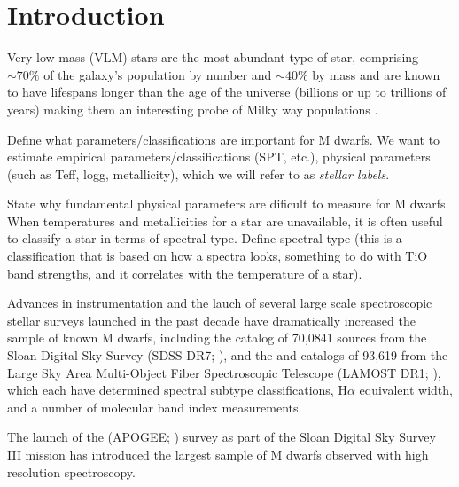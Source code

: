 \documentclass[modern]{aastex62}
\begin{document}
 
\section{Introduction} \label{sec:intro}

Very low mass (VLM) stars are the most abundant type of star, comprising $\sim 70 \%$ of the galaxy's population by number \citep{Bochanski:2010} and $\sim 40 \%$ by mass and are known to have lifespans longer than the age of the universe (billions or up to trillions of years) \citep{Laughlin:1997} making them an interesting probe of Milky way populations \citep{Bochanski:2007}.


Define what parameters/classifications are important for M dwarfs. We want to estimate empirical parameters/classifications (SPT, etc.), physical parameters (such as Teff, logg, metallicity), which we will refer to as \emph{stellar labels}. 

State why fundamental physical parameters are dificult to measure for M dwarfs. When temperatures and metallicities for a star are unavailable, it is often useful to classify a star in terms of spectral type. Define spectral type (this is a classification that is based on how a spectra looks, something to do with TiO band strengths, and it correlates with the temperature of a star).


Advances in instrumentation and the lauch of several large scale spectroscopic stellar surveys launched in the past decade have dramatically increased the sample of known M dwarfs, including the \citealt{West:2011} catalog of 70,0841 sources from the Sloan Digital Sky Survey (SDSS DR7; \citealt{Abazajian:2009}), and the \citealt{Yi:2014} and \citealt{Guo:2015} catalogs of 93,619 from the Large Sky Area Multi-Object Fiber Spectroscopic Telescope (LAMOST DR1; \citealt{Zhao:2012}), which each have determined spectral subtype classifications, H$\alpha$ equivalent width, and a number of molecular band index measurements. 

The launch of the (APOGEE; \citealt{Majewski:2015}) survey as part of the Sloan Digital Sky Survey III mission \citealt{Eisenstein:2011} has introduced the largest sample of M dwarfs observed with high resolution spectroscopy. 
\end{document}
